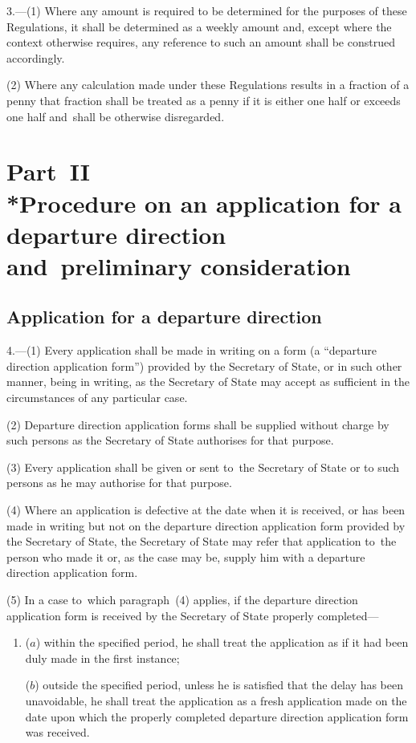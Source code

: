 \documentclass[12pt,a4paper]{article}
\begin{document}
3.—(1) Where any amount is required to be determined for
the purposes of these Regulations, it shall be determined as a weekly amount
and, except where the context otherwise requires, any reference to such an
amount shall be construed accordingly.

(2) Where any calculation made under these Regulations results in a fraction of
a penny that fraction shall be treated as a penny if it is either one half or
exceeds one half and~shall be otherwise disregarded.

\vfill

\section[Part~II --- Procedure on an application for a departure direction and~preliminary consideration]{Part~II\\*Procedure on an application for a departure direction and~preliminary consideration}

\renewcommand\parthead{--- Part~II}

\subsection[4. Application for a departure direction]{Application for a departure direction}

4.—(1) Every application shall
be made in writing on a form (a “departure direction application form”) provided
by the Secretary of State, or in such other manner, being in writing, as the
Secretary of State may accept as sufficient in the circumstances of any
particular case.

(2) Departure direction application forms shall be supplied without charge by
such persons as the Secretary of State authorises for that purpose.

(3) Every application shall be given or sent to~the Secretary of State or to
such persons as he may authorise for that purpose.

(4) Where an application is defective at the date when it is received, or has
been made in writing but not on the departure direction application form
provided by the Secretary of State, the Secretary of State may refer that
application to~the person who made it or, as the case may be, supply him with a
departure direction application form.

(5) In a case to~which paragraph~(4) applies, if the departure direction
application form is received by the Secretary of State properly completed—
\begin{enumerate}\item[]
($a$) within the specified period, he shall treat the application as if it had been
duly made in the first instance;

($b$) outside the specified period, unless he is satisfied that the delay has been
unavoidable, he shall treat the application as a fresh application made on the
date upon which the properly completed departure direction application form was
received.
\end{enumerate}
\end{document}
